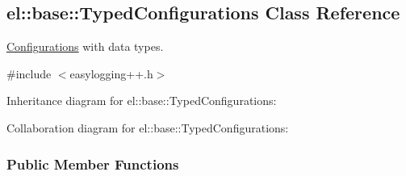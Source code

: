 \hypertarget{a00092}{}\subsection{el\+:\+:base\+:\+:Typed\+Configurations Class Reference}
\label{a00092}


\hyperlink{a00014}{Configurations} with data types.  




{\ttfamily \#include $<$easylogging++.\+h$>$}



Inheritance diagram for el\+:\+:base\+:\+:Typed\+Configurations\+:


Collaboration diagram for el\+:\+:base\+:\+:Typed\+Configurations\+:
\subsubsection*{Public Member Functions}
